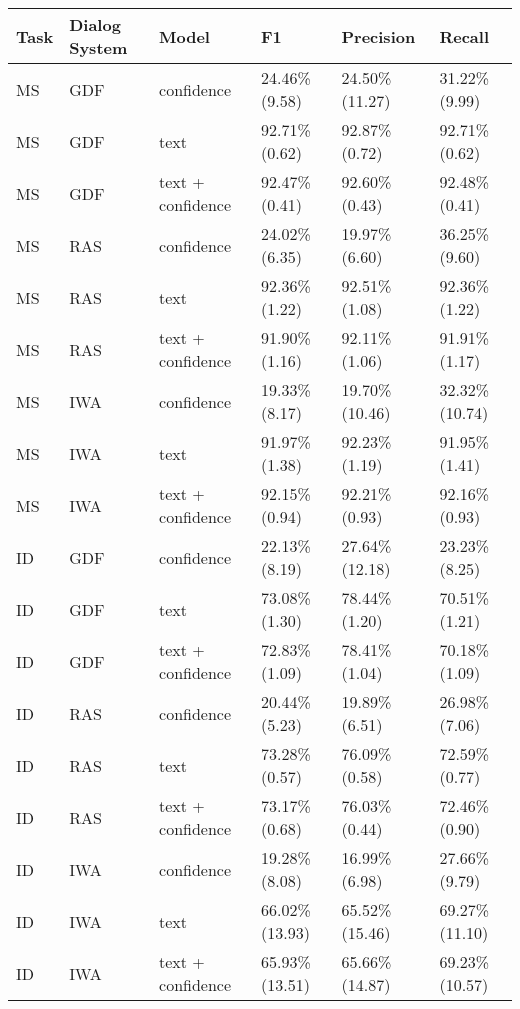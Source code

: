 \begin{tabular}{llllll}
\toprule
Task & Dialog System &              Model &              F1 &       Precision &          Recall \\
\midrule
  MS &           GDF &         confidence &   24.46\% (9.58) &  24.50\% (11.27) &   31.22\% (9.99) \\
  MS &           GDF &               text &   92.71\% (0.62) &   92.87\% (0.72) &   92.71\% (0.62) \\
  MS &           GDF &  text + confidence &   92.47\% (0.41) &   92.60\% (0.43) &   92.48\% (0.41) \\
  MS &           RAS &         confidence &   24.02\% (6.35) &   19.97\% (6.60) &   36.25\% (9.60) \\
  MS &           RAS &               text &   92.36\% (1.22) &   92.51\% (1.08) &   92.36\% (1.22) \\
  MS &           RAS &  text + confidence &   91.90\% (1.16) &   92.11\% (1.06) &   91.91\% (1.17) \\
  MS &           IWA &         confidence &   19.33\% (8.17) &  19.70\% (10.46) &  32.32\% (10.74) \\
  MS &           IWA &               text &   91.97\% (1.38) &   92.23\% (1.19) &   91.95\% (1.41) \\
  MS &           IWA &  text + confidence &   92.15\% (0.94) &   92.21\% (0.93) &   92.16\% (0.93) \\
  ID &           GDF &         confidence &   22.13\% (8.19) &  27.64\% (12.18) &   23.23\% (8.25) \\
  ID &           GDF &               text &   73.08\% (1.30) &   78.44\% (1.20) &   70.51\% (1.21) \\
  ID &           GDF &  text + confidence &   72.83\% (1.09) &   78.41\% (1.04) &   70.18\% (1.09) \\
  ID &           RAS &         confidence &   20.44\% (5.23) &   19.89\% (6.51) &   26.98\% (7.06) \\
  ID &           RAS &               text &   73.28\% (0.57) &   76.09\% (0.58) &   72.59\% (0.77) \\
  ID &           RAS &  text + confidence &   73.17\% (0.68) &   76.03\% (0.44) &   72.46\% (0.90) \\
  ID &           IWA &         confidence &   19.28\% (8.08) &   16.99\% (6.98) &   27.66\% (9.79) \\
  ID &           IWA &               text &  66.02\% (13.93) &  65.52\% (15.46) &  69.27\% (11.10) \\
  ID &           IWA &  text + confidence &  65.93\% (13.51) &  65.66\% (14.87) &  69.23\% (10.57) \\
\bottomrule
\end{tabular}
